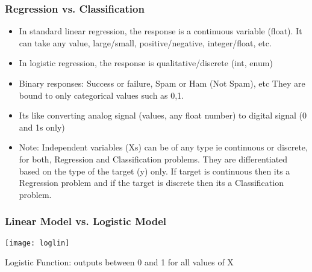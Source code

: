 \begin{frame}[fragile]\frametitle{Regression vs. Classification}
\begin{itemize}
\item In standard linear regression, the response is a continuous variable (float). It can take any value, large/small, positive/negative, integer/float, etc.
\item In logistic regression, the response is qualitative/discrete (int, enum)
\item Binary responses: Success or failure, Spam or Ham (Not Spam), etc They are bound to only categorical values such as 0,1.
\item Its like converting analog signal (values, any float number) to digital signal (0 and 1s only)
\item Note: Independent variables (Xs) can be of any type ie continuous or discrete, for both, Regression and Classification problems. They are differentiated based on the type of the target (y) only. If target is continuous then its a Regression problem and if the target is discrete then its a Classification problem.
\end{itemize}

\end{frame}


\begin{frame}[fragile]\frametitle{Linear Model vs. Logistic Model}
\begin{center}
\texttt{[image: loglin]}
\end{center}
Logistic Function: outputs between 0 and 1 for all values of X

\end{frame}
